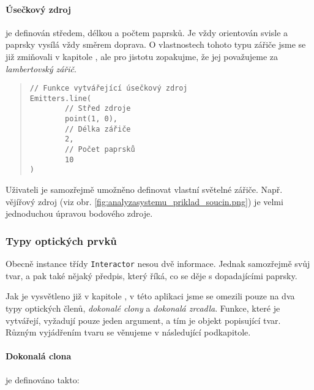 
\paragraph{Úsečkový zdroj} je definován středem, délkou a počtem paprsků. Je vždy orientován svisle a paprsky vysílá vždy směrem doprava. O vlastnostech tohoto typu zářiče jsme se již zmiňovali v kapitole , ale pro jistotu zopakujme, že jej považujeme za \emph{lambertovský zářič}.\src

\begin{minipage}{\textwidth}\begin{quote}\begin{lstlisting}
// Funkce vytvářející úsečkový zdroj
Emitters.line(
        // Střed zdroje
        point(1, 0),
        // Délka zářiče
        2,
        // Počet paprsků
        10
)
\end{lstlisting}\end{quote}\end{minipage}


Uživateli je samozřejmě umožněno definovat vlastní světelné zářiče. Např. vějířový zdroj (viz obr. \ref{fig:analyzasystemu_priklad_soucin.png}) je velmi jednoduchou úpravou bodového zdroje.


\subsubsection{Typy optických prvků}

Obecně instance třídy \texttt{Interactor} nesou dvě informace. Jednak samozřejmě svůj tvar, a pak také nějaký předpis, který říká, co se děje s dopadajícími paprsky.

Jak je vysvětleno již v kapitole , v této aplikaci jsme se omezili pouze na dva typy optických členů, \emph{dokonalé clony} a \emph{dokonalá zrcadla}. Funkce, které je vytvářejí, vyžadují pouze jeden argument, a tím je objekt popisující tvar. Různým vyjádřením tvaru se věnujeme v následující podkapitole.

\paragraph{Dokonalá clona} je definováno takto:

